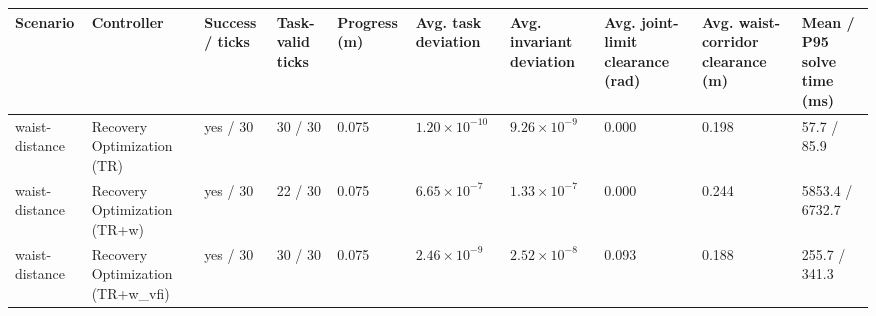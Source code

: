 \begin{tabular}{llllllllll}
\toprule
Scenario & Controller & Success / ticks & Task-valid ticks & Progress (m) & Avg. task deviation & Avg. invariant deviation & Avg. joint-limit clearance (rad) & Avg. waist-corridor clearance (m) & Mean / P95 solve time (ms) \\
\midrule
waist-distance & Recovery Optimization (TR) & yes / 30 & 30 / 30 & 0.075 & $1.20\times 10^{-10}$ & $9.26\times 10^{-9}$ & 0.000 & 0.198 & 57.7 / 85.9 \\
waist-distance & Recovery Optimization (TR+w) & yes / 30 & 22 / 30 & 0.075 & $6.65\times 10^{-7}$ & $1.33\times 10^{-7}$ & 0.000 & 0.244 & 5853.4 / 6732.7 \\
waist-distance & Recovery Optimization (TR+w\_vfi) & yes / 30 & 30 / 30 & 0.075 & $2.46\times 10^{-9}$ & $2.52\times 10^{-8}$ & 0.093 & 0.188 & 255.7 / 341.3 \\
\bottomrule
\end{tabular}
